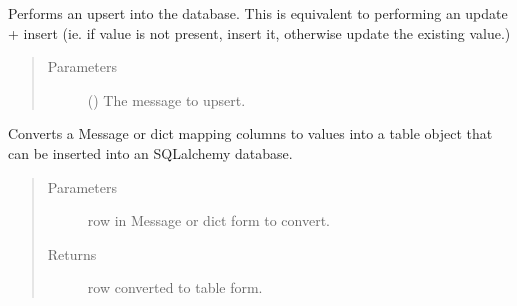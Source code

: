 \documentclass[letterpaper,10pt,english]{sphinxmanual}
\begin{document}
\begin{fulllineitems}

\begin{fulllineitems}
\label{\detokenize{Fireworks:Fireworks.extensions.database.TablePipe.update}}
\end{fulllineitems}


\begin{fulllineitems}
\label{\detokenize{Fireworks:Fireworks.extensions.database.TablePipe.upsert}}
Performs an upsert into the database. This is equivalent to performing an update + insert (ie. if value is not present, insert it,
otherwise update the existing value.)
\begin{quote}\begin{description}
\item[{Parameters}] \leavevmode
{} ({\hyperref[\detokenize{Fireworks:Fireworks.core.message.Message}]{}}) \textendash{} The message to upsert.

\end{description}\end{quote}

\end{fulllineitems}


\begin{fulllineitems}
\label{\detokenize{Fireworks:Fireworks.extensions.database.TablePipe.make_row}}
Converts a Message or dict mapping columns to values into a table object that can be inserted into an SQLalchemy database.
\begin{quote}\begin{description}
\item[{Parameters}] \leavevmode
{} \textendash{} row in Message or dict form to convert.

\item[{Returns}] \leavevmode
row converted to table form.


\end{description}
\end{quote}
\end{fulllineitems}
\end{fulllineitems}
\end{document}
